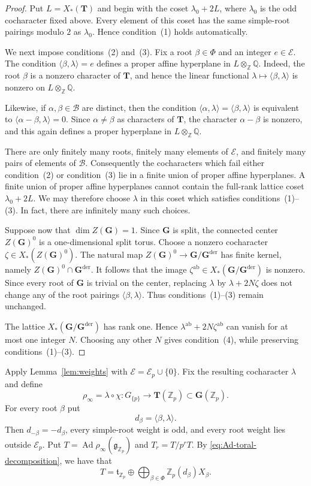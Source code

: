 \documentclass[11pt]{amsart}
\numberwithin{equation}{section}
\newcommand{\Q}{\mathbb Q}
\newcommand{\Z}{\mathbb Z}
\newcommand{\Zp}{\mathbb Z_p}
\newcommand{\Ad}{\operatorname{Ad}}
\newcommand{\cE}{\mathcal E}
\newcommand{\frakg}{\mathfrak g}
\newcommand{\frakt}{\mathfrak t}
\newcommand{\GG}{\mathbf G}
\newcommand{\TT}{\mathbf T}
\newcommand{\Gder}{\mathbf G^{\mathrm{der}}}
\theoremstyle{definition}
\begin{document}
\begin{proof}
Put $L=X_*(\TT)$ and begin with the coset
$\lambda_0+2L$, where $\lambda_0$ is the odd cocharacter fixed above.
Every element of this coset has the same simple-root pairings modulo
$2$ as $\lambda_0$. Hence condition~(1) holds automatically.

We next impose conditions~(2) and~(3). Fix a root $\beta\in\Phi$ and
an integer $e\in\cE$. The condition
$\langle\beta,\lambda\rangle=e$ defines a proper affine hyperplane in
$L\otimes_{\Z}\Q$. Indeed, the root $\beta$ is a nonzero character of
$\TT$, and hence the linear functional
$\lambda\mapsto\langle\beta,\lambda\rangle$ is nonzero on
$L\otimes_{\Z}\Q$.

Likewise, if $\alpha,\beta\in\mathcal B$ are distinct, then the
condition
$\langle\alpha,\lambda\rangle=\langle\beta,\lambda\rangle$ is
equivalent to
$\langle\alpha-\beta,\lambda\rangle=0$. Since $\alpha\neq\beta$ as
characters of $\TT$, the character $\alpha-\beta$ is nonzero, and this
again defines a proper hyperplane in $L\otimes_{\Z}\Q$.

There are only finitely many roots, finitely many elements of $\cE$,
and finitely many pairs of elements of $\mathcal B$. Consequently the
cocharacters which fail either condition~(2) or condition~(3) lie in
a finite union of proper affine hyperplanes. A finite union of proper
affine hyperplanes cannot contain the full-rank lattice coset
$\lambda_0+2L$. We may therefore choose $\lambda$ in this coset which
satisfies conditions~(1)--(3). In fact, there are infinitely many such
choices.

Suppose now that $\dim Z(\GG)=1$. Since $\GG$ is split, the connected
center $Z(\GG)^0$ is a one-dimensional split torus. Choose a nonzero
cocharacter $\zeta\in X_*(Z(\GG)^0)$. The natural map
$Z(\GG)^0\to\GG/\Gder$ has finite kernel, namely
$Z(\GG)^0\cap\Gder$. It follows that the image
$\zeta^{\mathrm{ab}}\in X_*(\GG/\Gder)$ is nonzero. Since every root
of $\GG$ is trivial on the center, replacing $\lambda$ by
$\lambda+2N\zeta$ does not change any of the root pairings
$\langle\beta,\lambda\rangle$. Thus conditions~(1)--(3) remain
unchanged.

The lattice $X_*(\GG/\Gder)$ has rank one. Hence
$\lambda^{\mathrm{ab}}+2N\zeta^{\mathrm{ab}}$ can vanish for at most
one integer $N$. Choosing any other $N$ gives condition~(4), while
preserving conditions~(1)--(3).
\end{proof}
Apply Lemma~\ref{lem:weights} with $\cE=\cE_p\cup\{0\}$. Fix the resulting cocharacter $\lambda$ and define
\begin{equation}\label{eq:rho-infty}
 \rho_\infty=\lambda\circ\chi:
 G_{\{p\}}\longrightarrow\TT(\Zp)\subset\GG(\Zp).
\end{equation}
For every root $\beta$ put
\[
        d_\beta=\langle\beta,\lambda\rangle.
\]
Then $d_{-\beta}=-d_\beta$, every simple-root weight is odd, and every
root weight lies outside $\cE_p$.  Put $T=\Ad\rho_\infty(\frakg_{\Zp})$ and $T_r=T/p^rT$. By \eqref{eq:Ad-toral-decomposition}, we have that
\begin{equation}\label{eq:T-decomposition}
 T=\frakt_{\Zp}\oplus
 \bigoplus_{\beta\in\Phi}\Zp(d_\beta)X_\beta.
\end{equation}
\end{document}
